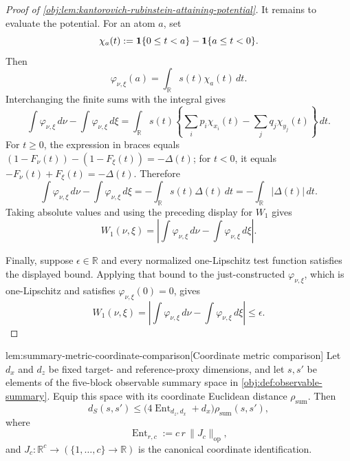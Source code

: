 \documentclass[11pt]{article}
\begin{document}
\begin{proof}[Proof of \cref{obj:lem:kantorovich-rubinstein-attaining-potential}]
It remains to evaluate the potential.  For an atom \(a\), set
\[
\chi_a(t):=
{\bf 1}\{0\le t<a\}-{\bf 1}\{a\le t<0\}.
\]
Then
\[
\varphi_{\nu,\xi}(a)=\int_{\mathbb R}s(t)\chi_a(t)\,dt .
\]
Interchanging the finite sums with the integral gives
\[
\int \varphi_{\nu,\xi}\,d\nu-\int \varphi_{\nu,\xi}\,d\xi
=
\int_{\mathbb R}s(t)
\left\{
\sum_i p_i\chi_{x_i}(t)-\sum_j q_j\chi_{y_j}(t)
\right\}\,dt .
\]
For \(t\ge0\), the expression in braces equals
\((1-F_\nu(t))-(1-F_\xi(t))=-\Delta(t)\); for \(t<0\), it equals
\(-F_\nu(t)+F_\xi(t)=-\Delta(t)\).  Therefore
\[
\int \varphi_{\nu,\xi}\,d\nu-\int \varphi_{\nu,\xi}\,d\xi
=
-\int_{\mathbb R}s(t)\Delta(t)\,dt
=
-\int_{\mathbb R}|\Delta(t)|\,dt .
\]
Taking absolute values and using the preceding display for \(W_1\) gives
\[
W_1(\nu,\xi)
=
\left|
  \int \varphi_{\nu,\xi}\,d\nu
  -
  \int \varphi_{\nu,\xi}\,d\xi
\right|.
\]

Finally, suppose \(\epsilon\in\mathbb R\) and every normalized one-Lipschitz test function satisfies the displayed bound.  Applying that bound to the just-constructed \(\varphi_{\nu,\xi}\), which is one-Lipschitz and satisfies \(\varphi_{\nu,\xi}(0)=0\), gives
\[
W_1(\nu,\xi)
=
\left|
  \int \varphi_{\nu,\xi}\,d\nu
  -
  \int \varphi_{\nu,\xi}\,d\xi
\right|
\le \epsilon .
\]
\end{proof}

\begin{lemmav}{lem:summary-metric-coordinate-comparison}[Coordinate metric comparison]
Let \(d_x\) and \(d_z\) be fixed target- and reference-proxy dimensions, and let \(s,s'\) be elements of the five-block observable summary space in \cref{obj:def:observable-summary}. Equip this space with its coordinate Euclidean distance \(\rho_{\mathrm{sum}}\). Then
\[
d_S(s,s')
\le
\bigl(4\operatorname{Ent}_{d_z,d_x}+d_x\bigr)\rho_{\mathrm{sum}}(s,s'),
\]
where
\[
\operatorname{Ent}_{r,c}
:=
c\,r\,\|J_c\|_{\mathrm{op}},
\]
and \(J_c:\mathbb R^c\to(\{1,\ldots,c\}\to\mathbb R)\) is the canonical coordinate identification.
\end{lemmav}
\end{document}
